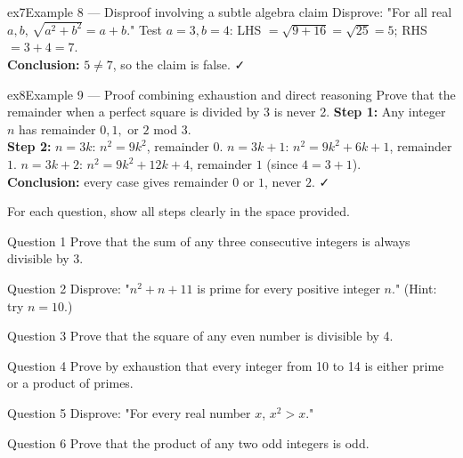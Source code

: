 \documentclass[11pt]{article}
\begin{document}
\begin{example}{ex7}{Example 8 --- Disproof involving a subtle algebra claim}
Disprove: "For all real $a,b$, $\sqrt{a^2+b^2}=a+b$."\soln
Test $a=3,b=4$: LHS $=\sqrt{9+16}=\sqrt{25}=5$; RHS $=3+4=7$.\\[3pt]\textbf{Conclusion:} $5\neq7$, so the claim is false. ✓
\end{example}

\begin{example}{ex8}{Example 9 --- Proof combining exhaustion and direct reasoning}
Prove that the remainder when a perfect square is divided by 3 is never 2.\soln
\textbf{Step 1:} Any integer $n$ has remainder $0,1,$ or $2$ mod 3.\\[3pt]
\textbf{Step 2:} $n=3k$: $n^2=9k^2$, remainder $0$. $n=3k+1$: $n^2=9k^2+6k+1$, remainder $1$. $n=3k+2$: $n^2=9k^2+12k+4$, remainder $1$ (since $4=3+1$).\\[3pt]\textbf{Conclusion:} every case gives remainder $0$ or $1$, never $2$. ✓
\end{example}

\clearpage
{}
For each question, show all steps clearly in the space provided.

\begin{qbox}{Question 1}
Prove that the sum of any three consecutive integers is always divisible by 3.\workspace{2.4cm}
\end{qbox}

\begin{qbox}{Question 2}
Disprove: "$n^2+n+11$ is prime for every positive integer $n$." (Hint: try $n=10$.)\workspace{2.4cm}
\end{qbox}

\begin{qbox}{Question 3}
Prove that the square of any even number is divisible by 4.\workspace{2.4cm}
\end{qbox}

\begin{qbox}{Question 4}
Prove by exhaustion that every integer from 10 to 14 is either prime or a product of primes.\workspace{2.4cm}
\end{qbox}

\begin{qbox}{Question 5}
Disprove: "For every real number $x$, $x^2>x$."\workspace{2.4cm}
\end{qbox}

\begin{qbox}{Question 6}
Prove that the product of any two odd integers is odd.\workspace{2.4cm}
\end{qbox}
\end{document}
